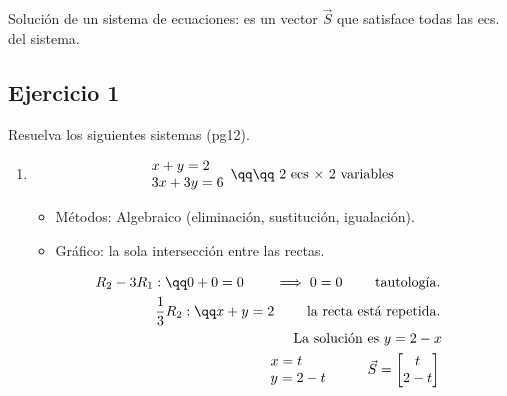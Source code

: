 Solución de un sistema de ecuaciones: es un vector $\vec{S}$ que satisface todas las ecs. del sistema.

\subsection{Ejercicio 1}
Resuelva los siguientes sistemas (pg12).
\begin{enumerate}
    \item 
        \begin{center}
            \begin{align*}
                \begin{array}{l}
                    x+y=2 \\ 3x+3y=6 \\ 
                \end{array}
                \qq \qq 
                \text{ 2 ecs $\times$ 2 variables } \\ 
            \end{align*}
        \end{center}
        \begin{itemize}
            \item Métodos: Algebraico (eliminación, sustitución, igualación).
            \item Gráfico: la sola intersección entre las rectas.
        \end{itemize}
        \begin{center}
           \begin{align*}
               R_2-3R_1: \qq 0+0=0 \qquad \implies 0=0 \qquad \text{ tautología. } \\ 
               \frac{1}{3} R_2: \qq x+y=2 \qquad \text{ la recta está repetida. } \\ 
               \text{ La solución es $y=2-x$ } \\ 
               \begin{array}{l}
                   x=t \\ 
                   y=2-t \\ 
               \end{array} \qquad 
               \begin{array}{l}
                   \vec{S} = \begin{bmatrix}
                       t \\ 2-t \\ 
                   \end{bmatrix}
               \end{array}

\end{align*}
\end{center}
\end{enumerate}
